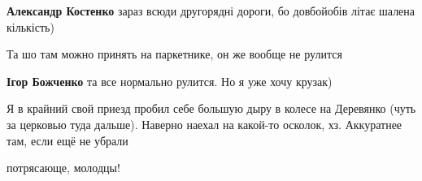\begin{itemize}
\begin{itemize}
\textbf{Александр Костенко} зараз всюди другорядні дороги, бо довбойобів літає шалена кількість)
\end{itemize} %

Та шо там можно принять на паркетнике, он же вообще не рулится

\textbf{Ігор Божченко} та все нормально рулится. Но я уже хочу крузак)


Я в крайний свой приезд пробил себе большую дыру в колесе на Деревянко (чуть за
церковью туда дальше). Наверно наехал на какой-то осколок, хз. Аккуратнее там,
если ещё не убрали

потрясающе, молодцы!

\end{itemize} %
